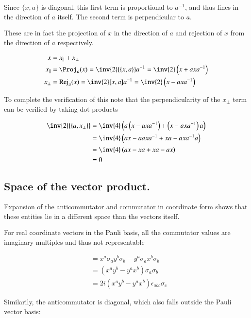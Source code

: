 \documentclass{article}
\newcommand{\symmetric}[2]{{\{{#1},{#2}\}}}
\newcommand{\antisymmetric}[2]{[{#1},{#2}]}
\begin{document}
Since $\symmetric{x}{a}$ is diagonal, this first term is proportional to $a^{-1}$, and thus lines in the direction of $a$ itself.
The second term is perpendicular to $a$.

These are in fact the projection of $x$ in the direction of $a$ and rejection of $x$ from the direction of $a$ respectively.

\begin{align*}
x &= x_\parallel + x_\perp \\
x_\parallel &= \Proj_a(x) = \inv{2}\symmetric{x}{a}a^{-1} = \inv{2}\left(x + a x a^{-1} \right) \\
x_\perp &= \RejName_a(x) = \inv{2} \antisymmetric{x}{a} a^{-1} = \inv{2} \left( x - a x a^{-1} \right) \\
\end{align*}

To complete the verification of this note that the perpendicularity of the $x_\perp$ term can be verified by taking dot products

\begin{align*}
\inv{2}\symmetric{a}{x_\perp} 
&= \inv{4}\left( a \left(x - a x a^{-1} \right) +\left(x - a x a^{-1} \right) a \right) \\
&= \inv{4}\left( a x - a a x a^{-1} + x a - a x a^{-1} a \right) \\
&= \inv{4}\left( a x - x a + x a - a x \right) \\
&= 0
\end{align*}

\subsection{ Space of the vector product. }

Expansion of the anticommutator and commutator in coordinate form shows that these entities lie in a different space than the vectors itself.

For real coordinate vectors in the Pauli basis, all the commutator values are imaginary multiples and thus not representable

\begin{align*}
\antisymmetric{x}{y} 
&= x^a \sigma_a y^b \sigma_b - y^a \sigma_a x^b \sigma_b \\
&= (x^a y^b - y^a x^b) \sigma_a \sigma_b \\
&= 2 i (x^a y^b - y^a x^b) \epsilon_{a b c} \sigma_c
\end{align*}

Similarily, the anticommutator is diagonal, which also falls outside the Pauli vector basis:
\end{document}
